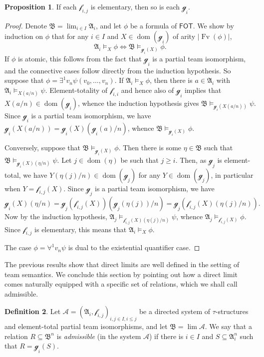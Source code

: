 \documentclass[a4paper]{amsart}
\theoremstyle{definition}
\newtheorem{definition}{Definition}[section]
\newtheorem{proposition}[definition]{Proposition}
\theoremstyle{remark}
\newcommand{\A}{\mathcal{A}}
\newcommand{\B}{\mathcal{B}}
\DeclareMathOperator{\dom}{dom}
\DeclareMathOperator{\Fv}{Fv}
\newcommand{\existsone}{\exists^1}
\newcommand{\forallone}{\forall^1}
\newcommand\fot{\mathsf{FOT}}
\theoremstyle{definition}
\renewcommand{\A}{\mathfrak{A}}
\renewcommand{\B}{\mathfrak{B}}
\newcommand{\f}{\mathcal{f}}
\newcommand{\g}{\mathcal{g}}
\begin{document}
\begin{proposition}\label{prop:direct.limit.maps.elementary}
    If each $\f_{i,j}$ is elementary, then so is each $\g_i$.
\end{proposition}
\begin{proof}
    Denote $\B = \lim_{i\in I}\A_i$, and let $\phi$ be a formula of $\fot$. We show by induction on $\phi$ that for any $i\in I$ and $X\in\dom(\g_i)$ of arity $|\Fv(\phi)|$,
    \[
        \A_i\models_X\phi \iff \B\models_{\g_i(X)}\phi.
    \]
    If $\phi$ is atomic, this follows from the fact that $\g_i$ is a partial team isomorphism, and the connective cases follow directly from the induction hypothesis. So suppose that $\phi = \existsone v_n\psi(v_0,\dots,v_n)$. If $\A_i\models_X\phi$, then there is $a\in\A_i$ with $\A_i\models_{X(a/n)}\psi$. Element-totality of $\f_{i,i}$ and hence also of $\g_i$ implies that $X(a/n)\in\dom(\g_i)$, whence the induction hypothesis gives $\B\models_{\g_i(X(a/n))}\psi$. Since $\g_i$ is a partial team isomorphism, we have $\g_i(X(a/n)) = \g_i(X)(\g_i(a)/n)$, whence $\B\models_{\g_i(X)}\phi$.
    
    Conversely, suppose that $\B\models_{\g_i(X)}\phi$. Then there is some $\eta\in\B$ such that $\B\models_{\g_i(X)(\eta/n)}\psi$. Let $j\in\dom(\eta)$ be such that $j\geq i$. Then, as $\g_j$ is element-total, we have $Y(\eta(j)/n)\in\dom(\g_j)$ for any $Y\in\dom(\g_j)$, in particular when $Y = \f_{i,j}(X)$. Since $\g_j$ is a partial team isomorphism, we have
    \[
        \g_i(X)(\eta/n) = \g_j(\f_{i,j}(X))(\g_j(\eta(j))/n) = \g_j(\f_{i,j}(X)(\eta(j)/n)).
    \]
    Now by the induction hypothesis, $\A_j\models_{\f_{i,j}(X)(\eta(j)/n)}\psi$, whence $\A_j\models_{\f_{i,j}(X)}\phi$. Since $\f_{i,j}$ is elementary, this means that $\A_i\models_X\phi$.

    The case $\phi = \forallone v_n\psi$ is dual to the existential quantifier case.
\end{proof}


The previous results show that direct limits are well defined in the setting of team semantics. We conclude this section by pointing out how a direct limit comes naturally equipped with a specific set of relations, which we shall call admissible.

\begin{definition}\label{bounded/admissible.maps0}
    Let $\mathcal A = (\A_i, \f_{i,j})_{i,j\in I, i\leq j}$ be a directed system of $\tau$-structures and element-total partial team isomorphisms, and let $\B = \lim\mathcal A$.
    We say that a relation $R\subseteq\B^n$ is \emph{admissible} (in the system $\mathcal A$) if there is $i\in I$ and $S\subseteq\A_i^n$ such that $R = \g_i(S)$.
\end{definition}
\end{document}
